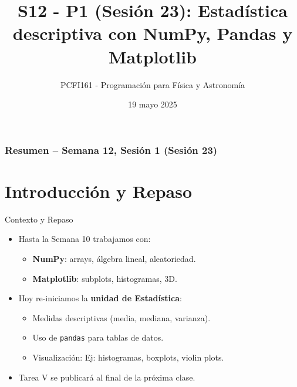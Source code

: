 \documentclass[10pt]{beamer}
\title{S12 - P1 (Sesión 23): Estadística descriptiva con NumPy, Pandas y Matplotlib}
\author{PCFI161 - Programación para Física y Astronomía}
\date{19 mayo 2025}
\begin{document}
\myfront{}
\begin{frame}
  \titlepage
\end{frame}

\begin{frame}
  \frametitle{Resumen – Semana 12, Sesión 1 (Sesión 23)}
  \tableofcontents
\end{frame}


\section{Introducción y Repaso}
\begin{frame}{Contexto y Repaso}
  \begin{itemize}
    \item Hasta la Semana 10 trabajamos con:
      \begin{itemize}
        \item \textbf{NumPy}: arrays, álgebra lineal, aleatoriedad.
        \item \textbf{Matplotlib}: subplots, histogramas, 3D.
      \end{itemize}
    \item Hoy re-iniciamos la \textbf{unidad de Estadística}:
      \begin{itemize}
        \item Medidas descriptivas (media, mediana, varianza).
        \item Uso de \texttt{pandas} para tablas de datos.
        \item Visualización: Ej: histogramas, boxplots, violin plots.
      \end{itemize}
    \item \alert{Tarea V} se publicará al final de la próxima clase.
  \end{itemize}
\end{frame}

\end{document}
